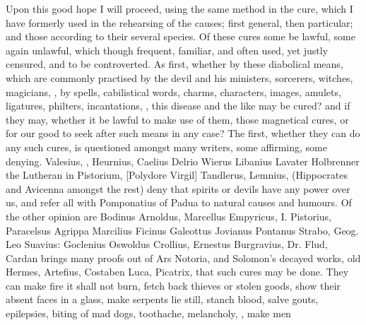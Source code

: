 {Upon this good hope I will proceed, using the same method in the cure, which I
have formerly used in the rehearsing of the causes; first general, then
particular; and those according to their several species. Of these cures some
be lawful, some again unlawful, which though frequent, familiar, and often
used, yet justly censured, and to be controverted. As first, whether by these
diabolical means, which are commonly practised by the devil and his ministers,
sorcerers, witches, magicians, \etc{}, by spells, cabilistical words, charms,
characters, images, amulets, ligatures, philters, incantations, \etc{}, this
disease and the like may be cured? and if they may, whether it be lawful to
make use of them, those magnetical cures, or for our good to seek after such
means in any case? The first, whether they can do any such cures, is questioned
amongst many writers, some affirming, some denying. Valesius,
, Heurnius,
 Caelius
 Delrio 
Wierus  Libanius Lavater
 Holbrenner the Lutheran in
Pistorium, [Polydore Virgil]  Tandlerus, Lemnius, (Hippocrates and Avicenna amongst the rest)
deny that spirits or devils have any power over us, and refer all with
Pomponatius of Padua to natural causes and humours. Of the other opinion are
Bodinus  Arnoldus,
Marcellus Empyricus, I. Pistorius, Paracelsus  Agrippa  Marcilius Ficinus  Galeottus  Jovianus Pontanus  Strabo,  Geog. Leo Suavius:
Goclenius  Oswoldus Crollius, Ernestus
Burgravius, Dr. Flud, \etc{} Cardan  brings many
proofs out of Ars Notoria, and Solomon's decayed works, old Hermes, Artefius,
Costaben Luca, Picatrix, \etc{} that such cures may be done. They can make fire
it shall not burn, fetch back thieves or stolen goods, show their absent faces
in a glass, make serpents lie still, stanch blood, salve gouts, epilepsies,
biting of mad dogs, toothache, melancholy, , make men
}
